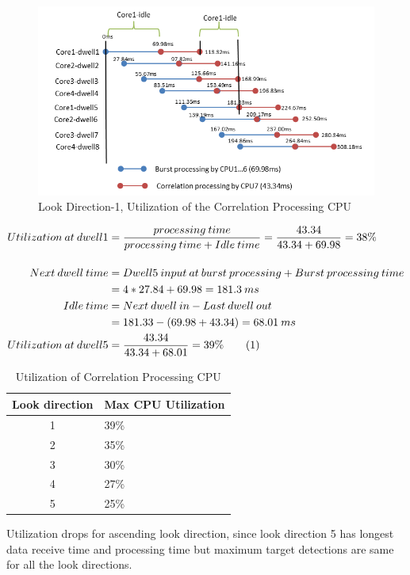 \begin{figure}[h!]
	\centering
	\includegraphics[width=160mm]{figures/scheme4_corr_timeline}
	\caption{Look Direction-1, Utilization of the Correlation Processing CPU}
	\label{fig:mm:scheme4_corr_cpu_util}
\end{figure}

\begin{align*}
	Utilization \: at \: dwell1 &= \frac{processing \: time}{processing \: time + Idle \: time } = \frac{43.34}{43.34 + 69.98} = 38\% \\[0.4cm]
	Next \: dwell \: time &= Dwell5 \: input \: at \: burst \: processing + Burst \: processing \: time \\
	&= 4 * 27.84 + 69.98 =181.3 \: ms\\
	Idle \: time &= Next \: dwell \: in - Last \: dwell \: out \\
	&= 181.33 - (69.98 + 43.34) = 68.01 \: ms \\
	Utilization \: at \: dwell5 &= 	\frac{43.34}{43.34 + 68.01} = 39\%  \stepcounter{equation}\tag{\theequation}
\end{align*}

\begin{table}[h!]
	\centering
	\begin{tabular}{|c|l|} 
	 \hline
	 \textbf{Look direction} & \textbf{Max CPU Utilization} \\
	 \hline
	 1 & 39\%  \\ \hline
	 2 & 35\%  \\ \hline
	 3 & 30\%  \\ \hline
	 4 & 27\%  \\ \hline
	 5 & 25\%  \\ \hline
	\end{tabular}
	\caption{Utilization of Correlation Processing CPU}
	\label{tbl:mm:scheme4_corr_cpu_util}
\end{table}
Utilization drops for ascending look direction, since look direction 5 has longest data receive time and processing time but maximum target detections are same for all the look directions. 

